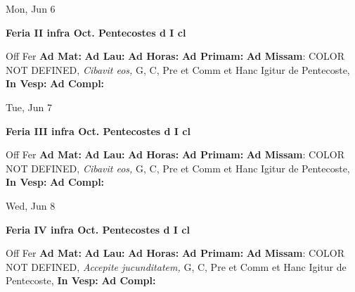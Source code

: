 \documentclass[10pt]{memoir}
\begin{document}
\begin{center}
\begin{minipage}{3.5in}
\vspace{2em}
\begin{center}Mon, Jun 6
\end{center}
\textbf{ \large Feria II infra Oct. Pentecostes
\textnormal{\normalsize d I cl}}

\begin{justify}Off Fer
\textbf{Ad Mat: }
\textbf{Ad Lau: }
\textbf{Ad Horas: }
\textbf{Ad Primam: }\textbf{Ad Missam}: COLOR NOT DEFINED, \textit{Cibavit eos,} G, C, Pre et Comm et Hanc Igitur de Pentecoste, 
\textbf{In Vesp: }
\textbf{Ad Compl: }
\end{justify}
\end{minipage}
\end{center}

\begin{center}
\begin{minipage}{3.5in}
\vspace{2em}
\begin{center}Tue, Jun 7
\end{center}
\textbf{ \large Feria III infra Oct. Pentecostes
\textnormal{\normalsize d I cl}}

\begin{justify}Off Fer
\textbf{Ad Mat: }
\textbf{Ad Lau: }
\textbf{Ad Horas: }
\textbf{Ad Primam: }\textbf{Ad Missam}: COLOR NOT DEFINED, \textit{Cibavit eos,} G, C, Pre et Comm et Hanc Igitur de Pentecoste, 
\textbf{In Vesp: }
\textbf{Ad Compl: }
\end{justify}
\end{minipage}
\end{center}

\begin{center}
\begin{minipage}{3.5in}
\vspace{2em}
\begin{center}Wed, Jun 8
\end{center}
\textbf{ \large Feria IV infra Oct. Pentecostes
\textnormal{\normalsize d I cl}}

\begin{justify}Off Fer
\textbf{Ad Mat: }
\textbf{Ad Lau: }
\textbf{Ad Horas: }
\textbf{Ad Primam: }\textbf{Ad Missam}: COLOR NOT DEFINED, \textit{Accepite jucunditatem,} G, C, Pre et Comm et Hanc Igitur de Pentecoste, 
\textbf{In Vesp: }
\textbf{Ad Compl: }
\end{justify}
\end{minipage}
\end{center}
\end{document}
